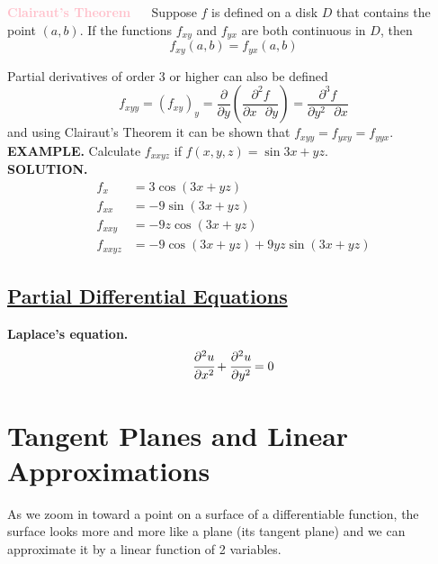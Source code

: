 \documentclass{article}
\begin{document}
\begin{mdframed}
  \textbf{\textcolor{pink}{\selectfont Clairaut's Theorem}} $\quad$ Suppose $f $ is defined on a disk $D $ that contains the point $(a, b )$. If the functions $f _ {xy}$ and $f _ {yx }$ are both continuous in $D $, then 
  \[f _ {xy} (a, b) = f _ {yx} (a, b )\]
\end{mdframed}
Partial derivatives of order 3 or higher can also be defined
\[f _ {xyy} = (f _ {xy}) _ y = \frac{\partial }{ \partial y } \left( \frac{\partial ^2 f }{\partial x \text{ } \partial y }\right) = \frac{\partial ^3 f }{\partial y^2 \text{ } \partial x}\]
and using Clairaut's Theorem it can be shown that $f _ {xyy} = f _ {y xy} = f _ {yy x }$. \\
{\selectfont \textbf{\textcolor{blue5}{{\small {}} EXAMPLE.}}} Calculate $f _ {xxyz}$ if $f(x,y,z) = \sin{3x + yz}$. \\
\textbf{\textcolor{blue5}{\selectfont \small SOLUTION.}} $\quad $ 
\begin{equation*}
  \begin{split}
     f _ {x} & = 3 \cos{(3x + yz) } \\
     f _ {xx} & = -9 \sin{(3x + yz)} \\
     f _ {xxy} & = -9z \cos{(3x + yz)} \\
     f _ {xxyz} & = -9 \cos{(3x + yz)} + 9yz \sin{(3x + yz)}
  \end{split}
\end{equation*}

\subsection*{{\selectfont \underline{Partial Differential Equations}}}
\textbf{Laplace's equation.}
$$\cfrac{\partial ^2 u }{\partial x^2 } + \cfrac{\partial ^2 u }{\partial y^2 } = 0 $$

\section{Tangent Planes and Linear Approximations}
As we zoom in toward a point on a surface of a differentiable function, the surface looks more and more like a plane (its tangent plane) and we can approximate it by a linear function of 2 variables.
\end{document}
